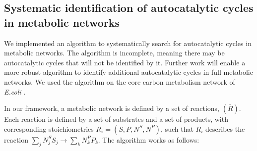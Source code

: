   \subsection{Systematic identification of autocatalytic cycles in metabolic networks}
  We implemented an algorithm to systematically search for autocatalytic cycles in metabolic networks.
  The algorithm is incomplete, meaning there may be autocatalytic cycles that will not be identified by it.
  Further work will enable a more robust algorithm to identify additional autocatalytic cycles in full metabolic networks.
  We used the algorithm on the core carbon metabolism network of \emph{E.coli} \cite{Orth2010-vl}.

  In our framework, a metabolic network is defined by a set of reactions, $(\bar{R})$.
  Each reaction is defined by a set of substrates and a set of products, with corresponding stoichiometries $R_i=(S,P,N^S,N^P)$, such that $R_i$ describes the reaction $\sum_j N_j^SS_j \rightarrow \sum_k N_k^PP_k$.
  The algorithm works as follows:
